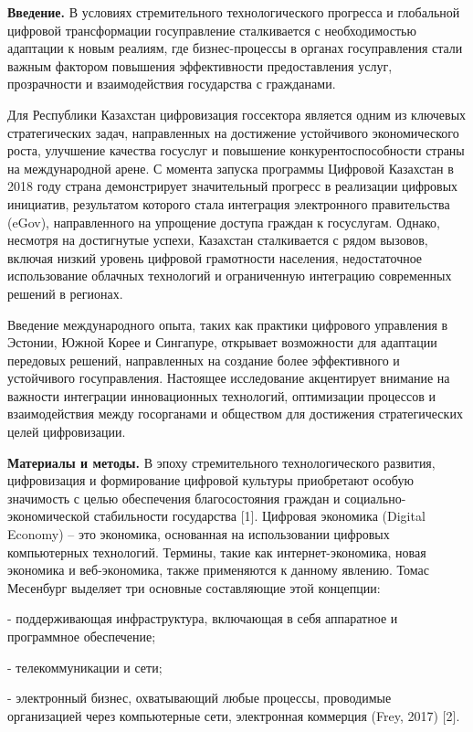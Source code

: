 \begin{multicols}{2}
{\bfseries Введение.} В условиях стремительного технологического прогресса
и глобальной цифровой трансформации госуправление сталкивается с
необходимостью адаптации к новым реалиям, где бизнес-процессы в органах
госуправления стали важным фактором повышения эффективности
предоставления услуг, прозрачности и взаимодействия государства с
гражданами.

Для Республики Казахстан цифровизация госсектора является одним из
ключевых стратегических задач, направленных на достижение устойчивого
экономического роста, улучшение качества госуслуг и повышение
конкурентоспособности страны на международной арене. С момента запуска
программы Цифровой Казахстан в 2018 году страна демонстрирует
значительный прогресс в реализации цифровых инициатив, результатом
которого стала интеграция электронного правительства (eGov),
направленного на упрощение доступа граждан к госуслугам. Однако,
несмотря на достигнутые успехи, Казахстан сталкивается с рядом вызовов,
включая низкий уровень цифровой грамотности населения, недостаточное
использование облачных технологий и ограниченную интеграцию современных
решений в регионах.

Введение международного опыта, таких как практики цифрового управления в
Эстонии, Южной Корее и Сингапуре, открывает возможности для адаптации
передовых решений, направленных на создание более эффективного и
устойчивого госуправления. Настоящее исследование акцентирует внимание
на важности интеграции инновационных технологий, оптимизации процессов и
взаимодействия между госорганами и обществом для достижения
стратегических целей цифровизации.

{\bfseries Материалы и методы.} В эпоху стремительного технологического
развития, цифровизация и формирование цифровой культуры приобретают
особую значимость с целью обеспечения благосостояния граждан и
социально-экономической стабильности государства {[}1{]}. Цифровая
экономика (Digital Economy) -- это экономика, основанная на
использовании цифровых компьютерных технологий. Термины, такие как
интернет-экономика, новая экономика и веб-экономика, также применяются к
данному явлению. Томас Месенбург выделяет три основные составляющие этой
концепции:

- поддерживающая инфраструктура, включающая в себя аппаратное и
программное обеспечение;

- телекоммуникации и сети;

- электронный бизнес, охватывающий любые процессы, проводимые
организацией через компьютерные сети, электронная коммерция (Frey, 2017)
{[}2{]}.


\end{multicols}
